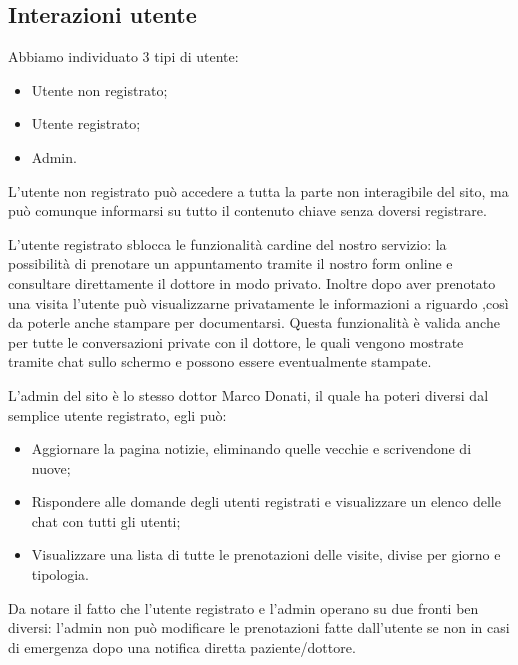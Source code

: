 \subsection{Interazioni utente}

Abbiamo individuato 3 tipi di utente:
\begin{itemize}
\item Utente non registrato;
\item Utente registrato;
\item Admin.
\end{itemize}

L’utente non registrato può accedere a tutta la parte non interagibile del sito, ma può comunque informarsi su tutto il contenuto chiave senza doversi registrare.

L’utente registrato sblocca le funzionalità cardine del nostro servizio: la possibilità di prenotare un appuntamento tramite il nostro form online e consultare direttamente il dottore in modo privato.
Inoltre dopo aver prenotato una visita l’utente può visualizzarne privatamente le informazioni a riguardo ,così da poterle anche stampare per documentarsi.
Questa funzionalità è valida anche per tutte le conversazioni private con il dottore, le quali vengono mostrate tramite chat sullo schermo e possono essere eventualmente stampate.

L’admin del sito è lo stesso dottor Marco Donati, il quale ha poteri diversi dal semplice utente registrato, egli può:

\begin{itemize}
\item Aggiornare la pagina notizie, eliminando quelle vecchie e scrivendone di nuove;
\item Rispondere alle domande degli utenti registrati e visualizzare un elenco delle chat con tutti gli utenti;
\item Visualizzare una lista di tutte le prenotazioni delle visite, divise per giorno e tipologia.
\end{itemize}

Da notare il fatto che l’utente registrato e l’admin operano su due fronti ben diversi: l’admin non può modificare le prenotazioni fatte dall’utente se non in casi di emergenza dopo una notifica diretta paziente/dottore.